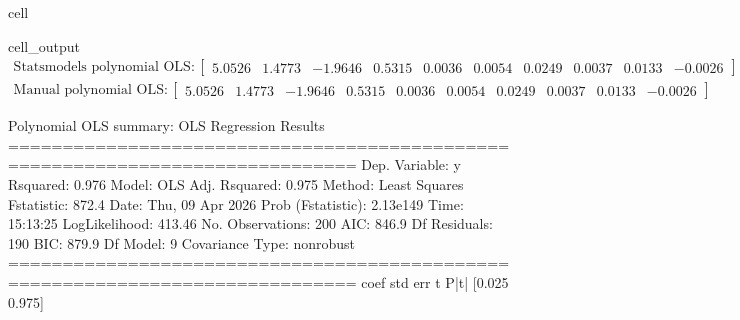 \documentclass[letterpaper,10pt,english]{jupyterBook}
\begin{document}
\begin{sphinxuseclass}{cell}
\begin{sphinxVerbatimOutput}
\begin{sphinxuseclass}{cell_output}\begin{equation*}
\begin{split}\displaystyle \text{Statsmodels polynomial OLS}:\left[
\begin{array}{}
  5.0526 &  1.4773 & -1.9646 &  0.5315 &  0.0036 &  0.0054 &  0.0249 &  0.0037 &  0.0133 & -0.0026
\end{array}
\right]\end{split}
\end{equation*}\begin{equation*}
\begin{split}\displaystyle \text{Manual polynomial OLS}:\left[
\begin{array}{}
  5.0526 &  1.4773 & -1.9646 &  0.5315 &  0.0036 &  0.0054 &  0.0249 &  0.0037 &  0.0133 & -0.0026
\end{array}
\right]\end{split}
\end{equation*}
\begin{sphinxVerbatim}[commandchars=\\\{\}]
Polynomial OLS summary:
                             OLS Regression Results                            
==============================================================================
Dep. Variable:                      y   R\PYGZhy{}squared:                       0.976
Model:                            OLS   Adj. R\PYGZhy{}squared:                  0.975
Method:                 Least Squares   F\PYGZhy{}statistic:                     872.4
Date:                Thu, 09 Apr 2026   Prob (F\PYGZhy{}statistic):          2.13e\PYGZhy{}149
Time:                        15:13:25   Log\PYGZhy{}Likelihood:                \PYGZhy{}413.46
No. Observations:                 200   AIC:                             846.9
Df Residuals:                     190   BIC:                             879.9
Df Model:                           9                                         
Covariance Type:            nonrobust                                         
==============================================================================
                 coef    std err          t      P\PYGZgt{}|t|      [0.025      0.975]
\PYGZhy{}\PYGZhy{}\PYGZhy{}\PYGZhy{}\PYGZhy{}\PYGZhy{}\PYGZhy{}\PYGZhy{}\PYGZhy{}\PYGZhy{}\PYGZhy{}\PYGZhy{}\PYGZhy{}\PYGZhy{}\PYGZhy{}\PYGZhy{}\PYGZhy{}\PYGZhy{}\PYGZhy{}\PYGZhy{}\PYGZhy{}\PYGZhy{}\PYGZhy{}\PYGZhy{}\PYGZhy{}\PYGZhy{}\PYGZhy{}\PYGZhy{}\PYGZhy{}\PYGZhy{}\PYGZhy{}\PYGZhy{}\PYGZhy{}\PYGZhy{}\PYGZhy{}\PYGZhy{}\PYGZhy{}\PYGZhy{}\PYGZhy{}\PYGZhy{}\PYGZhy{}\PYGZhy{}\PYGZhy{}\PYGZhy{}\PYGZhy{}\PYGZhy{}\PYGZhy{}\PYGZhy{}\PYGZhy{}\PYGZhy{}\PYGZhy{}\PYGZhy{}\PYGZhy{}\PYGZhy{}\PYGZhy{}\PYGZhy{}\PYGZhy{}\PYGZhy{}\PYGZhy{}\PYGZhy{}\PYGZhy{}\PYGZhy{}\PYGZhy{}\PYGZhy{}\PYGZhy{}\PYGZhy{}\PYGZhy{}\PYGZhy{}\PYGZhy{}\PYGZhy{}\PYGZhy{}\PYGZhy{}\PYGZhy{}\PYGZhy{}\PYGZhy{}\PYGZhy{}\PYGZhy{}\PYGZhy{}

\end{sphinxVerbatim}
\end{sphinxuseclass}
\end{sphinxVerbatimOutput}
\end{sphinxuseclass}
\end{document}
